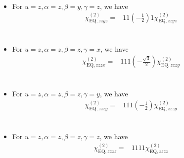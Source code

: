 \documentclass[UTF8,10pt,a4paper]{article}
\begin{document}
\begin{itemize}
\begin{align}
&
\end{align}\normalsize
\item For $u=z,\alpha=z,\beta=y,\gamma=z$, we have
\footnotesize\begin{align}
\nonumber\chi_{\text{EQ},zzyz}^{(2)}=&11\left(-\frac{1}{2}\right)1\chi_{\text{EQ},zzyz}^{(2)}\\
\nonumber&\\
\nonumber&\\
\nonumber&\\
&
\end{align}\normalsize
\item For $u=z,\alpha=z,\beta=z,\gamma=x$, we have
\footnotesize\begin{align}
\nonumber\chi_{\text{EQ},zzzx}^{(2)}=&111\left(-\frac{\sqrt{3}}{2}\right)\chi_{\text{EQ},zzzy}^{(2)}\\
\nonumber&\\
\nonumber&\\
\nonumber&\\
&
\end{align}\normalsize
\item For $u=z,\alpha=z,\beta=z,\gamma=y$, we have
\footnotesize\begin{align}
\nonumber\chi_{\text{EQ},zzzy}^{(2)}=&111\left(-\frac{1}{2}\right)\chi_{\text{EQ},zzzy}^{(2)}\\
\nonumber&\\
\nonumber&\\
\nonumber&\\
&
\end{align}\normalsize
\item For $u=z,\alpha=z,\beta=z,\gamma=z$, we have
\footnotesize\begin{align}
\nonumber\chi_{\text{EQ},zzzz}^{(2)}=&1111\chi_{\text{EQ},zzzz}^{(2)}\\
\nonumber&\\
\nonumber&\\
\nonumber&\\
&
\end{align}\normalsize
\end{itemize}
\end{document}
